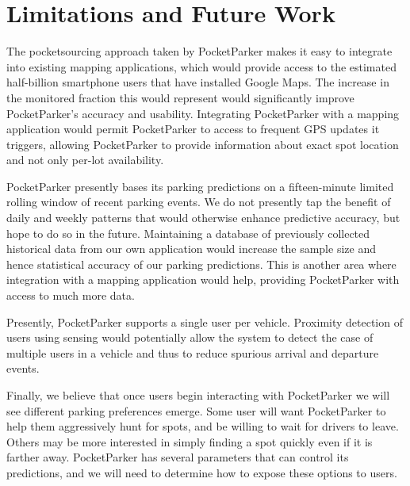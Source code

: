 \section{Limitations and Future Work}

The pocketsourcing approach taken by PocketParker makes it easy to integrate
into existing mapping applications, which would provide access to the estimated
half-billion smartphone users that have installed Google Maps. The increase in
the monitored fraction this would represent would significantly improve
PocketParker's accuracy and usability. Integrating PocketParker with a mapping
application would permit PocketParker to access to frequent GPS updates it
triggers, allowing PocketParker to provide information about exact spot
location and not only per-lot availability.

PocketParker presently bases its parking predictions on a fifteen-minute
limited rolling window of recent parking events. We do not presently tap the
benefit of daily and weekly patterns that would otherwise enhance predictive
accuracy, but hope to do so in the future. Maintaining a database of
previously collected historical data from our own application would increase
the sample size and hence statistical accuracy of our parking predictions.
This is another area where integration with a mapping application would help,
providing PocketParker with access to much more data.

Presently, PocketParker supports a single user per vehicle. Proximity detection
of users using sensing would potentially allow the system to detect the case of
multiple users in a vehicle and thus to reduce spurious arrival and departure
events.

Finally, we believe that once users begin interacting with PocketParker we
will see different parking preferences emerge. Some user will want
PocketParker to help them aggressively hunt for spots, and be willing to wait
for drivers to leave. Others may be more interested in simply finding a spot
quickly even if it is farther away. PocketParker has several parameters that
can control its predictions, and we will need to determine how to expose
these options to users.

%
%
%
%
%
%
%
